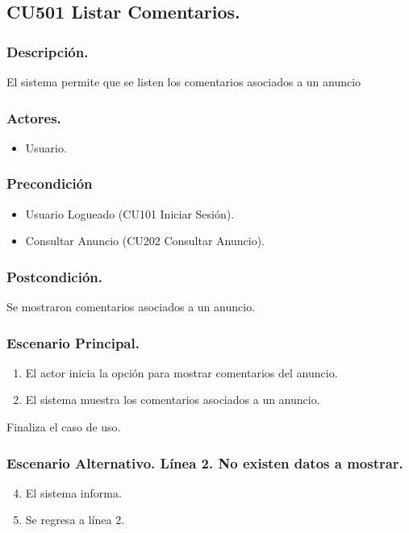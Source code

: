 \subsection{CU501 Listar Comentarios.}
\subsubsection{Descripci\'{o}n.}
El sistema permite que se listen los comentarios asociados a un anuncio
\subsubsection{Actores.}
\begin{itemize}
\item Usuario.
\end{itemize}
\subsubsection{Precondici\'{o}n}
\begin{itemize}
\item Usuario Logueado (CU101 Iniciar Sesi\'{o}n).
\item Consultar Anuncio (CU202 Consultar Anuncio).
\end{itemize}
\subsubsection{Postcondici\'{o}n.}
Se mostraron comentarios asociados a un anuncio.
\subsubsection{Escenario Principal.}
\begin{enumerate}
\item El actor inicia la opci\'{o}n para mostrar comentarios del anuncio.
\item El sistema muestra los comentarios asociados a un anuncio.
\end{enumerate}
Finaliza el caso de uso.
\subsubsection{Escenario Alternativo. L\'{i}nea 2. No existen datos a mostrar.}
\begin{enumerate}
\setcounter{enumi}{3}
\item El sistema informa.
\item Se regresa a l\'{i}nea 2.
\end{enumerate}
